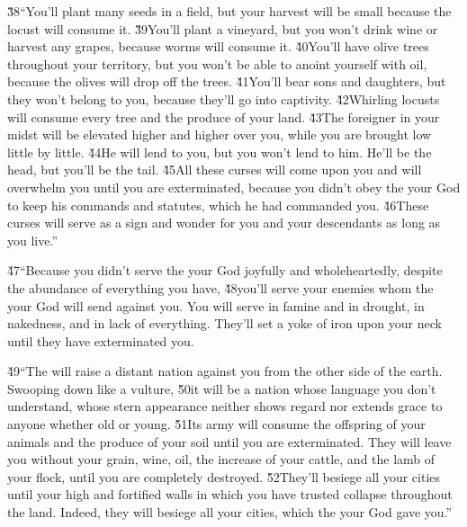 \v{38}``You'll plant many seeds in a field, but your harvest will be small because the locust will consume it. \v{39}You'll plant a vineyard, but you won't drink wine or harvest any grapes, because worms will consume it. \v{40}You'll have olive trees throughout your territory, but you won't be able to anoint yourself with oil, because the olives will drop off the trees. \v{41}You'll bear sons and daughters, but they won't belong to you, because they'll go into captivity. \v{42}Whirling locusts will consume every tree and the produce of your land. \v{43}The foreigner in your midst will be elevated higher and higher over you, while you are brought low little by little. \v{44}He will lend to you, but you won't lend to him. He'll be the head, but you'll be the tail. \v{45}All these curses will come upon you and will overwhelm you until you are exterminated, because you didn't obey the  your God to keep his commands and statutes, which he had commanded you. \v{46}These curses will serve as a sign and wonder for you and your descendants as long as you live.''

\v{47}``Because you didn't serve the  your God joyfully and wholeheartedly, despite the abundance of everything you have, \v{48}you'll serve your enemies whom the  your God will send against you. You will serve in famine and in drought, in nakedness, and in lack of everything. They'll set a yoke of iron upon your neck until they have exterminated you.

\v{49}``The  will raise a distant nation against you from the other side of the earth. Swooping down like a vulture, \v{50}it will be a nation whose language you don't understand, whose stern appearance neither shows regard nor extends grace to anyone whether old or young. \v{51}Its army will consume the offspring of your animals and the produce of your soil until you are exterminated. They will leave you without your grain, wine, oil, the increase of your cattle, and the lamb of your flock, until you are completely destroyed. \v{52}They'll besiege all your cities until your high and fortified walls in which you have trusted collapse throughout the land. Indeed, they will besiege all your cities, which the  your God gave you.''

